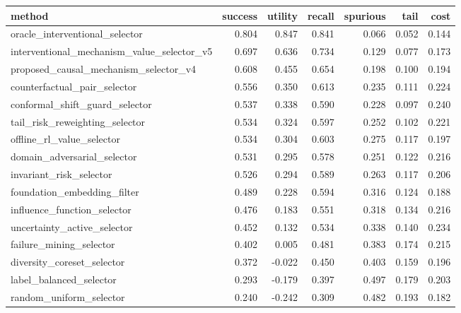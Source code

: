 \begin{tabular}{lrrrrrr}
\toprule
method & success & utility & recall & spurious & tail & cost \\
\midrule
oracle\_interventional\_selector & 0.804 & 0.847 & 0.841 & 0.066 & 0.052 & 0.144 \\
interventional\_mechanism\_value\_selector\_v5 & 0.697 & 0.636 & 0.734 & 0.129 & 0.077 & 0.173 \\
proposed\_causal\_mechanism\_selector\_v4 & 0.608 & 0.455 & 0.654 & 0.198 & 0.100 & 0.194 \\
counterfactual\_pair\_selector & 0.556 & 0.350 & 0.613 & 0.235 & 0.111 & 0.224 \\
conformal\_shift\_guard\_selector & 0.537 & 0.338 & 0.590 & 0.228 & 0.097 & 0.240 \\
tail\_risk\_reweighting\_selector & 0.534 & 0.324 & 0.597 & 0.252 & 0.102 & 0.221 \\
offline\_rl\_value\_selector & 0.534 & 0.304 & 0.603 & 0.275 & 0.117 & 0.197 \\
domain\_adversarial\_selector & 0.531 & 0.295 & 0.578 & 0.251 & 0.122 & 0.216 \\
invariant\_risk\_selector & 0.526 & 0.294 & 0.589 & 0.263 & 0.117 & 0.206 \\
foundation\_embedding\_filter & 0.489 & 0.228 & 0.594 & 0.316 & 0.124 & 0.188 \\
influence\_function\_selector & 0.476 & 0.183 & 0.551 & 0.318 & 0.134 & 0.216 \\
uncertainty\_active\_selector & 0.452 & 0.132 & 0.534 & 0.338 & 0.140 & 0.234 \\
failure\_mining\_selector & 0.402 & 0.005 & 0.481 & 0.383 & 0.174 & 0.215 \\
diversity\_coreset\_selector & 0.372 & -0.022 & 0.450 & 0.403 & 0.159 & 0.196 \\
label\_balanced\_selector & 0.293 & -0.179 & 0.397 & 0.497 & 0.179 & 0.203 \\
random\_uniform\_selector & 0.240 & -0.242 & 0.309 & 0.482 & 0.193 & 0.182 \\
\bottomrule
\end{tabular}
